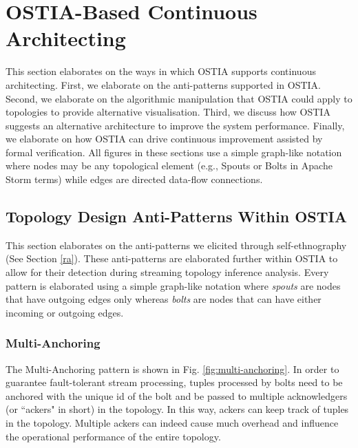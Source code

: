 \section{OSTIA-Based Continuous Architecting}
This section elaborates on the ways in which OSTIA supports continuous
architecting. First, we elaborate on the anti-patterns supported in
OSTIA. Second, we elaborate on the algorithmic manipulation that OSTIA could
apply to topologies to provide alternative visualisation. Third, we discuss how
OSTIA suggests an alternative architecture to improve the system
performance. Finally, we elaborate on how OSTIA can drive continuous
improvement assisted by formal verification. All figures in these sections use a
simple graph-like notation where nodes may be any topological element (e.g.,
Spouts or Bolts in Apache Storm terms) while edges are directed data-flow
connections.


\subsection{Topology Design Anti-Patterns Within OSTIA}\label{sec:anti-pattern}
This section elaborates on the anti-patterns we elicited through self-ethnography (See Section \ref{ra}). These anti-patterns are elaborated further within OSTIA to allow for their detection during streaming topology inference analysis. Every pattern is elaborated using a simple graph-like notation where \emph{spouts} are nodes that have outgoing edges only whereas \emph{bolts} are nodes that can have either incoming or outgoing edges.

\subsubsection{Multi-Anchoring}
The Multi-Anchoring pattern is shown in Fig. \ref{fig:multi-anchoring}. In order to guarantee fault-tolerant stream processing, tuples processed by bolts need to be anchored with the unique {\sf id} of the bolt and be passed to multiple acknowledgers (or ``ackers" in short) in the topology. In this way, ackers can keep track of tuples in the topology. Multiple ackers can indeed cause much overhead and influence the operational performance of the entire topology.


